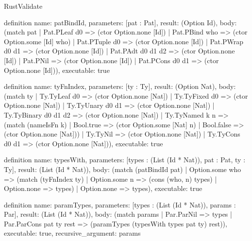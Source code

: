 \begin{lexlean}{RustValidate}
\begin{semanticmodule}
definition{
  name: patBindId,
  parameters: [pat : Pat],
  result: (Option Id),
  body: (match pat
    | Pat.PLeaf d0 => (ctor Option.none [Id])
    | Pat.PBind who => (ctor Option.some [Id] who)
    | Pat.PTuple d0 => (ctor Option.none [Id])
    | Pat.PWrap d0 d1 => (ctor Option.none [Id])
    | Pat.PAdt d0 d1 d2 => (ctor Option.none [Id])
    | Pat.PNil => (ctor Option.none [Id])
    | Pat.PCons d0 d1 => (ctor Option.none [Id])),
  executable: true
}

definition{
  name: tyFnIndex,
  parameters: [ty : Ty],
  result: (Option Nat),
  body: (match ty
    | Ty.TyLeaf d0 => (ctor Option.none [Nat])
    | Ty.TyFixed d0 => (ctor Option.none [Nat])
    | Ty.TyUnary d0 d1 => (ctor Option.none [Nat])
    | Ty.TyBinary d0 d1 d2 => (ctor Option.none [Nat])
    | Ty.TyNamed k n => (match (nameIsFn k)
      | Bool.true => (ctor Option.some [Nat] n)
      | Bool.false => (ctor Option.none [Nat]))
    | Ty.TyNil => (ctor Option.none [Nat])
    | Ty.TyCons d0 d1 => (ctor Option.none [Nat])),
  executable: true
}

definition{
  name: typesWith,
  parameters: [types : (List (Id * Nat)), pat : Pat, ty : Ty],
  result: (List (Id * Nat)),
  body: (match (patBindId pat)
    | Option.some who => (match (tyFnIndex ty)
      | Option.some n => (cons (who, n) types)
      | Option.none => types)
    | Option.none => types),
  executable: true
}

definition{
  name: paramTypes,
  parameters: [types : (List (Id * Nat)), params : Par],
  result: (List (Id * Nat)),
  body: (match params
    | Par.ParNil => types
    | Par.ParCons pat ty rest => (paramTypes (typesWith types pat ty) rest)),
  executable: true,
  recursive_argument: params
}


\end{semanticmodule}
\end{lexlean}
